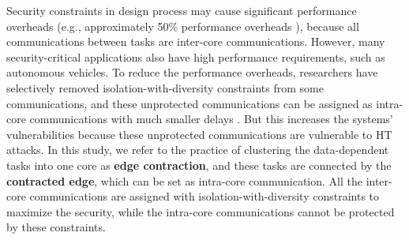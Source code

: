 \documentclass[10pt,journal, compsoc]{IEEEtran}
\begin{document}
%
Security constraints in design process may cause significant performance overheads (e.g., approximately 50\% performance overheads \cite{article:XC}), because all communications between tasks are inter-core communications. However, many security-critical applications also have high performance requirements, such as autonomous vehicles. To reduce the performance overheads, researchers have selectively removed isolation-with-diversity constraints from some communications, and these unprotected communications can be assigned as intra-core communications with much smaller delays \cite{article:CL, article:NW, conference:NW}. But this increases the systems' vulnerabilities because these unprotected communications are vulnerable to HT attacks. In this study, we refer to the practice of clustering the data-dependent tasks into one core as \textbf{edge contraction}, and these tasks are connected by the \textbf{contracted edge}, which can be set as intra-core communication. All the inter-core communications are assigned with isolation-with-diversity constraints to maximize the security, while the intra-core communications cannot be protected by these constraints.
\end{document}
